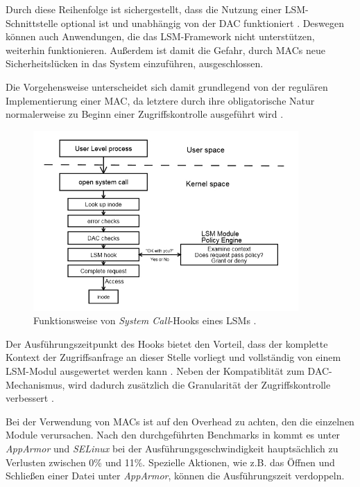 \documentclass[../main.tex]{subfiles}
\begin{document}
{			Durch diese Reihenfolge ist sichergestellt, dass die Nutzung einer LSM-Schnittstelle optional ist und unabhängig von der DAC funktioniert \cite{centOsMCS}. Deswegen können auch Anwendungen, die das LSM-Framework nicht unterstützen, weiterhin funktionieren. Außerdem ist damit die Gefahr, durch MACs neue Sicherheitslücken in das System einzuführen, ausgeschlossen.

			Die Vorgehensweise unterscheidet sich damit grundlegend von der regulären Implementierung einer MAC, da letztere durch ihre obligatorische Natur normalerweise zu Beginn einer Zugriffskontrolle ausgeführt wird \cite[S.3]{LSMFramework}.

			\begin{figure}[h]
					\centering
					\includegraphics[width=0.9\textwidth]{./images/sec_LSMHook.jpg}
					\caption{Funktionsweise von \emph{System Call}-Hooks eines LSMs \cite[S.3]{LSMFramework}.}
					\label{fig:sec_LSMHook}
			\end{figure}

			Der Ausführungszeitpunkt des Hooks bietet den Vorteil, dass der komplette Kontext der Zugriffsanfrage an dieser Stelle vorliegt und vollständig von einem LSM-Modul ausgewertet werden kann \cite[S.2]{LSMFramework}. Neben der Kompatiblität zum DAC-Mechanismus, wird dadurch zusätzlich die Granularität der Zugriffskontrolle verbessert \cite{LSMDesign}.

			Bei der Verwendung von MACs ist auf den Overhead zu achten, den die einzelnen Module verursachen. Nach den durchgeführten Benchmarks in \cite[S.51ff.]{SELinuxApparmor} kommt es unter \emph{AppArmor} und \emph{SELinux} bei der Ausführungsgeschwindigkeit hauptsächlich zu Verlusten zwischen 0\% und 11\%. Spezielle Aktionen, wie z.B. das Öffnen und Schließen einer Datei unter \emph{AppArmor}, können die Ausführungszeit verdoppeln.

}
\end{document}
